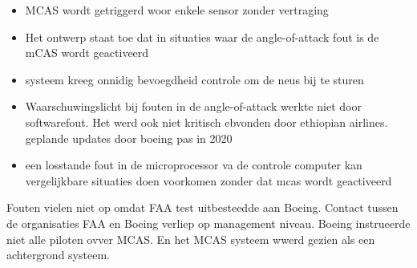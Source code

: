 \documentclass{article}
\begin{document}
	\begin{itemize}
		\item MCAS wordt getriggerd woor enkele sensor zonder vertraging
		\item Het ontwerp staat toe dat  in situaties waar de angle-of-attack fout is de mCAS wordt geactiveerd
		\item systeem kreeg onnidig bevoegdheid controle om de neus bij te sturen
		\item  Waarschuwingslicht bij fouten in de angle-of-attack werkte niet door  softwarefout. Het werd ook niet kritisch ebvonden door ethiopian airlines. geplande updates door boeing pas in 2020
		\item een losstande fout in de microprocessor va de controle computer kan vergelijkbare situaties doen voorkomen zonder dat mcas wordt geactiveerd
	\end{itemize}
	Fouten vielen niet op omdat FAA test uitbesteedde aan Boeing. Contact tussen de organisaties FAA en Boeing verliep op management niveau. Boeing instrueerde niet alle piloten ovver MCAS. En het MCAS systeem wwerd gezien als een achtergrond  systeem.
	
\end{document}
